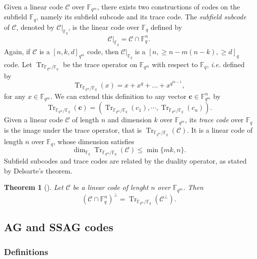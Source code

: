 \documentclass[a4paper]{amsart}
\newtheorem{thm}{Theorem}[section]
\theoremstyle{definition}
\theoremstyle{remark}
\newcommand{\calC}{\mathcal{C}}
\newcommand{\fqm}{\mathbb{F}_{q^m}}
\newcommand{\fq}{\mathbb{F}_{q}}
\newcommand{\Tr}[1]{\operatorname{Tr}_{\mathbb{F}_{q^m}/\fq}\left(#1\right)}
\begin{document}
Given a linear code $\calC$ over $\fqm$, there exists two constructions of codes on the subfield $\fq$, namely its subfield subcode and its trace code. The \emph{subfield subcode} of $\calC$, denoted by $\calC|_{\fq}$, is the linear code over $\fq$ defined by 
\[\calC|_{\fq}=\calC \cap \mathbb{F}_q^n.\]
Again, if $\calC$ is a $[n,k,d]_{q^m}$ code, then $\calC|_{\fq}$ is a $[n,\geq n-m(n-k),\geq d]_q$ code.
Let $\operatorname{Tr}_{\mathbb{F}_{q^m}/\fq}$ be the trace operator on $\mathbb{F}_{q^m}$ with respect to $\mathbb{F}_q$, \emph{i.e.} defined by
\[\Tr{x} = x + x^q + ... + x^{q^{m-1}},\]
for any $x \in \fqm$. We can extend this definition to any vector $\mathbf{c} \in \fqm^n$ by $$\Tr{\mathbf{c}}= (\Tr{c_1},\cdots,\Tr{c_n}).$$ 
Given a linear code $\calC$ of length $n$ and dimension $k$ over $\fqm$, its \emph{trace code} over $\fq$ is the image under the trace operator, that is $\Tr{\calC}$. It is a linear code of length $n$ over $\fq$, whose dimension satisfies
\begin{equation}\label{eq:dim_trace}
\dim_{\mathbb{F}_q} \Tr{\calC} \leq \min\{mk,n\}.
\end{equation}
Subfield subcodes and trace codes are related by the duality operator, as stated by Delsarte's theorem.

\begin{thm}[{\cite[Delsarte's theorem]{Del75}}] \label{th:delsarte}
Let $\calC$ be a linear code of lenght $n$ over $\fqm$. Then
\[\left(\calC \cap \fq^n\right)^{\perp} = \Tr{\calC^{\perp}}.\]
\end{thm}

\subsection{AG and SSAG codes} \label{section:AG_codes}

\subsubsection{Definitions}
\end{document}
